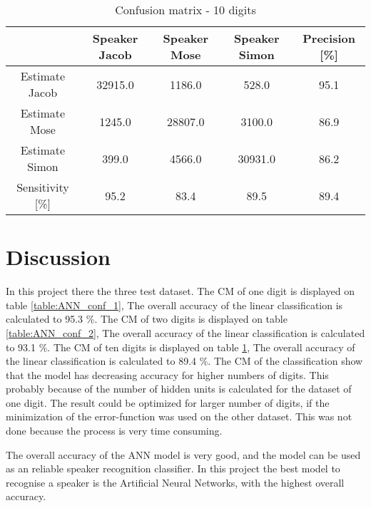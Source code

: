 \begin{table}[H]                                                    
\centering                                                          
\begin{tabular}{|c|c|c|c|c|}                                        
\hline                                                              
  & Speaker Jacob & Speaker Mose & Speaker Simon & Precision [\%] \\
\hline                                                              
Estimate Jacob & 32915.0 & 1186.0 & 528.0 & 95.1 \\                 
\hline                                                              
Estimate Mose & 1245.0 & 28807.0 & 3100.0 & 86.9 \\                 
\hline                                                              
Estimate Simon & 399.0 & 4566.0 & 30931.0 & 86.2 \\                 
\hline                                                              
Sensitivity [\%] & 95.2 & 83.4 & 89.5 & 89.4 \\                     
\hline                                                              
\end{tabular}                                                       
\caption{Confusion matrix - 10 digits}                              
\label{table:ANN_conf_10}                                           
\end{table}


\section{Discussion}
In this project there the three test dataset.
The CM of one digit is displayed on table \ref{table:ANN_conf_1}, The overall accuracy of the linear classification is  calculated to 95.3 \%.
The CM of two digits is displayed on table \ref{table:ANN_conf_2}, The overall accuracy of the linear classification is  calculated to 93.1 \%.
The CM of ten digits is displayed on table \ref{table:ANN_conf_10}, The overall accuracy of the linear classification is  calculated to 89.4 \%.
The CM of the classification show that the model has decreasing accuracy for higher numbers of digits.
This probably because of the number of hidden units is calculated for the dataset of one digit.
The result could be optimized for larger number of digits, if the minimization of the  error-function was used on the other dataset.
This was not done because the process is very time consuming.
 
The overall accuracy of the ANN model is very good, and the model can be used as an reliable speaker recognition classifier.    
In this project the best model to recognise a speaker is the Artificial Neural Networks, with the highest overall accuracy. 

 